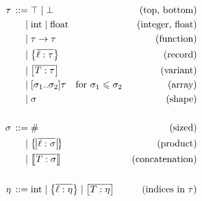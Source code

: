 \begin{align*}
\graintro \tau
\top \mid \bot 
& \text{(top, bottom)} 
\graitem
\mathrm{int} \mid \mathrm{float} 
& \text{(integer, float)}
\graitem
\tau \sfntype \tau 
& \text{(function)} 
\graitem
\srecordtype{\overline{\ell : \tau}} 
& \text{(record)} 
\graitem
\svarianttype{\overline{T : \tau}} 
& \text{(variant)}
\graitem
\sarraytype{\sigma_1}{\sigma_2}{\tau} \quad \text{for } \sigma_1 \sub \sigma_2 
& \text{(array)}
\graitem
\sigma 
& \text{(shape)} \\ 
\\
\graintro \sigma
\ssized 
& \text{(sized)}
\graitem
\sproducttype{\overline{ \ell : \sigma }} 
& \text{(product)} 
\graitem
\sconcattype{\overline{ T : \sigma }} 
& \text{(concatenation)} \\
\\
\graintro \eta
\mathrm{int} 
\mid
\srecordtype{\overline{\ell : \eta}} 
\mid
\svarianttype{\overline{T : \eta}} & \text{(indices in } \tau)
\end{align*}